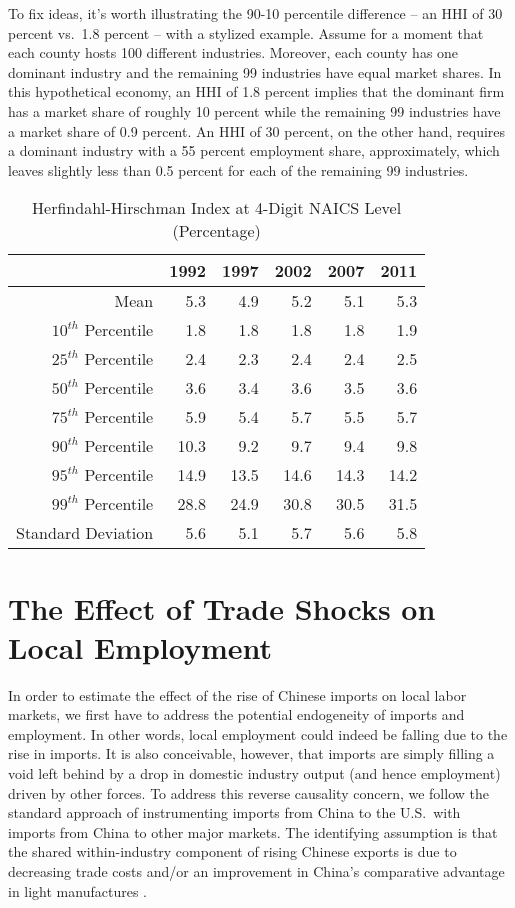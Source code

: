 \documentclass[onehalfspacing,11pt]{article}
\begin{document}
To fix ideas, it's worth illustrating the 90-10 percentile difference -- an HHI of 30 percent vs.~1.8 percent -- with a stylized example. Assume for a moment that each county hosts 100 different industries. Moreover, each county has one dominant industry and the remaining 99 industries have equal market shares. In this hypothetical economy, an HHI of 1.8 percent implies that the dominant firm has a market share of roughly 10 percent while the remaining 99 industries have a market share of 0.9 percent. An HHI of 30 percent, on the other hand, requires a dominant industry with a 55 percent employment share, approximately, which leaves slightly less than 0.5 percent for each of the remaining 99 industries.

\begin{table}
  \centering 
  \begin{tabular*}{.85\textwidth}{@{\extracolsep{\fill}} rrrrrr}
  \toprule
& 1992 & 1997 & 2002 & 2007 & 2011 \\
\midrule
Mean   			 & 5.3 & 4.9 & 5.2 & 5.1 & 5.3\\
$10^{th}$ Percentile   & 1.8 & 1.8 & 1.8 & 1.8 & 1.9 \\
$25^{th}$ Percentile   & 2.4 & 2.3 & 2.4 & 2.4 & 2.5 \\
$50^{th}$ Percentile   & 3.6 & 3.4 & 3.6 & 3.5 & 3.6 \\
$75^{th}$ Percentile   & 5.9 & 5.4 & 5.7 & 5.5 & 5.7 \\
$90^{th}$ Percentile   & 10.3 & 9.2 & 9.7 & 9.4 & 9.8 \\
$95^{th}$ Percentile   & 14.9 & 13.5 & 14.6 & 14.3 & 14.2 \\
$99^{th}$ Percentile   & 28.8 & 24.9 & 30.8 & 30.5 & 31.5\\
Standard Deviation	 & 5.6 & 5.1 & 5.7 & 5.6 & 5.8 \\
\bottomrule
\end{tabular*}
  \caption{Herfindahl-Hirschman Index at 4-Digit NAICS Level (Percentage)}\label{tab:hhi4}
\end{table}

\section{The Effect of Trade Shocks on Local Employment}
In order to estimate the effect of the rise of Chinese imports on local labor markets, we first have to address the potential endogeneity of imports and employment. In other words, local employment could indeed be falling due to the rise in imports. It is also conceivable, however, that imports are simply filling a void left behind by a drop in domestic industry output (and hence employment) driven by other forces. To address this reverse causality concern, we follow the standard approach of instrumenting imports from China to the U.S.~with imports from China to other major markets. The identifying assumption is that the shared within-industry component of rising Chinese exports is due to decreasing trade costs and/or an improvement in China's comparative advantage in light manufactures \citep[see][for a detailed discussion of the instrumental variable strategy]{Autor:2013}.
\end{document}
